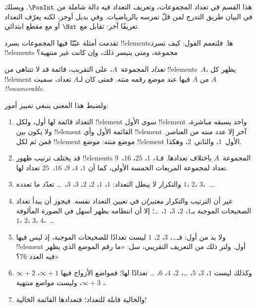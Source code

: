 \documentclass[../../../include/open-logic-section]{subfiles}
\begin{document}


\begin{editorial}
هذا القسم في تعداد المجموعات، وتعريف التعداد فيه دالة شاملة من
$\PosInt$. ويسلك في البيان طريق التدرج لمن قلّ تمرسه بالرياضيات.
وفي  بديل أوجز، لكنه يعرّف التعداد تعريفًا
آخر: تقابل مع $\Nat$ أو مع مقطع ابتدائي.
\end{editorial}

\begin{explain}
تقدمت أمثلة عيّنّا فيها المجموعات بسرد !!{element}sها.
فلنعمم القول: كيف نسرد !!{element}s مجموعة، ومتى يتيسر ذلك،
وإن كانت غير منتهية؟
\end{explain}

\begin{defn}
\emph{تعداد} المجموعة~$A$، على التقريب، قائمة قد لا تتناهى من
!!{element}s~$A$، يظهر كل !!{element} من $A$ فيها عند موضع
رقمه منته. فمتى كان لـ$A$ تعداد، سميت $A$ \emph{!!{enumerable}}.
\end{defn}

\begin{explain}
ولضبط هذا المعنى ينبغي تمييز أمور:
\begin{enumerate}
\item التعداد قائمة لها أول، ولكل !!{element} سوى الأول
!!{element} واحد يسبقه مباشرة، ولا يكون بين !!{element} القائمة
الأول وأي !!{element} آخر إلا عدد منته من العناصر. فمن ثم لكل
!!{element} موضع منته: موضع !!{element} الأول~$1$، والثاني~$2$، وهكذا.
\item قد يختلف ترتيب ظهور !!{element}s المجموعة~$A$ باختلاف تعدادها.
فـ$4$، $1$، $25$، $16$،~$9$ تعداد لمجموعة المربعات الخمسة الأولى،
كما أن $1$، $4$، $9$، $16$،~$25$ تعداد لها.
\item والتكرار لا يبطل التعداد: $1$، $1$، $2$، $2$، $3$، $3$،~\dots{}
تعدّد ما تعدده $1$، $2$، $3$،~\dots{}.
\item غير أن الترتيب والتكرار \emph{معتبران} في تعيين التعداد نفسه.
فيجوز أن يبدأ تعداد الصحيحات الموجبة بـ$1$، $2$، $3$، $1$، \dots{}؛
إلا أن انتظامه يظهر أسهل في الصورة المألوفة $1$، $2$، $3$، $4$،~\dots
\item ولا بد من أول: فـ\dots، $3$، $2$، $1$ ليست تعدادًا للصحيحات
الموجبة، إذ ليس فيها !!{element} أول. ولتر ذلك من التعريف التقريبي،
سل: «ما رقم الموضع الذي يظهر فيه العدد 76؟»
\item وكذلك ليست $1$، $3$، $5$، \dots، $2$، $4$، $6$، \dots\@
تعدادًا لها؛ فمواضع الأزواج فيها $\infty + 1$، $\infty + 2$، $\infty +
3$، وليست مواضع منتهية.
\item والخالية قابلة للتعداد؛ فتعدادها القائمة الخالية!{}
\end{enumerate}
\end{explain}
\end{document}
